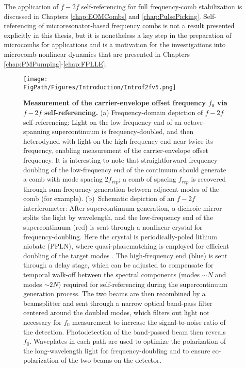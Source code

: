 The application of $f-2f$ self-referencing for full frequency-comb stabilization is discussed in Chapters \ref{chap:EOMCombs} and \ref{chap:PulsePicking}. Self-referencing of microresonator-based frequency combs is not a result presented explicitly in this thesis, but it is nonetheless a key step in the preparation of microcombs for applications and is a  motivation for the investigations into microcomb nonlinear dynamics that are presented in Chapters \ref{chap:PMPumping}-\ref{chap:FPLLE}.


\begin{figure}[htpb]
	\begin{center}
		\texttt{[image: \\FigPath/Figures/Introduction/Introf2fv5.png]}
	\end{center}
	\caption[Measurement of the carrier-envelope offset frequency via $f-2f$ self-referencing]{\textbf{Measurement of the carrier-envelope offset frequency $f_0$ via $f-2f$ self-referencing.} (a) Frequency-domain depiction of $f-2f$ self-referencing: Light on the low frequency end of an octave-spanning supercontinuum is frequency-doubled, and then heterodyned with light on the high frequency end near twice its frequency, enabling measurement of the carrier-envelope offset frequency. It is interesting to note that straightforward frequency-doubling of the low-frequency end of the continuum should generate a comb with mode spacing $2 f_{rep}$; a comb of spacing $f_{rep}$ is recovered through sum-frequency generation between adjacent modes of the comb (for example). (b)~Schematic depiction of an $f-2f$ interferometer: After supercontinuum generation, a dichroic mirror splits the light by wavelength, and the low-frequency end of the supercontinuum (red) is sent through a nonlinear crystal for frequency-doubling. Here the crystal is periodically-poled lithium niobate (PPLN), where quasi-phasematching is employed for efficient doubling of the target modes \cite{Hum2007}. The high-frequency end (blue) is sent through a delay stage, which can be adjusted to compensate for temporal walk-off between the spectral components (modes $\sim N$ and modes $\sim 2N$) required for self-referencing during the supercontinuum generation process. The two beams are then recombined by a beamsplitter and sent through a narrow optical band-pass filter centered around the doubled modes, which filters out light not necessary for $f_0$ measurement to increase the signal-to-noise ratio of the detection. Photodetection of the band-passed beam then reveals $f_0$. Waveplates in each path are used to optimize the polarization of the long-wavelength light for frequency-doubling and to ensure co-polarization of the two beams on the detector. }
	\label{fig:f2f}
\end{figure} 
